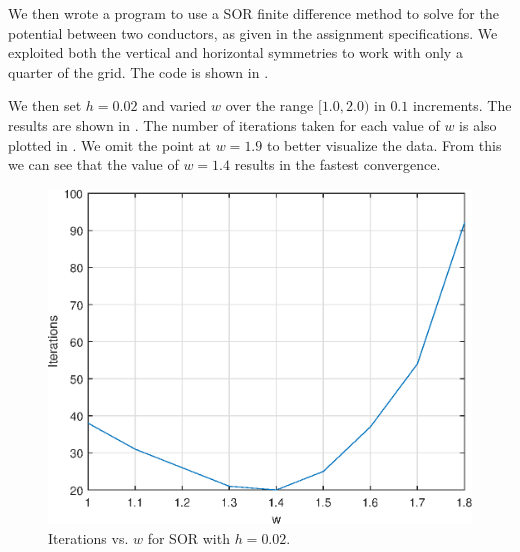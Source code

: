 \documentclass[journal,hidelinks]{IEEEtran}
\begin{document}
We then wrote a program to use a SOR finite difference method to solve for the potential between two conductors, as given in the assignment specifications. We exploited both the vertical and horizontal symmetries to work with only a quarter of the grid. The code is shown in .

We then set $h = 0.02$ and varied $w$ over the range $[1.0, 2.0)$ in $0.1$ increments. The results are shown in . The number of iterations taken for each value of $w$ is also plotted in . We omit the point at $w = 1.9$ to better visualize the data. From this we can see that the value of $w = 1.4$ results in the fastest convergence.

\begin{table}[!htb]
  \centering
  \caption{Results for SOR with $h = 0.02$ for different values of $w$.}
  \label{tab:q3-w-sor}
\end{table}

\begin{figure}[!htb]
  \centering
  \includegraphics[width=0.6\columnwidth]{question-3/w_sor.eps}
  \caption{Iterations vs. $w$ for SOR with $h = 0.02$.}
  \label{fig:q3-w}
\end{figure}
\end{document}
